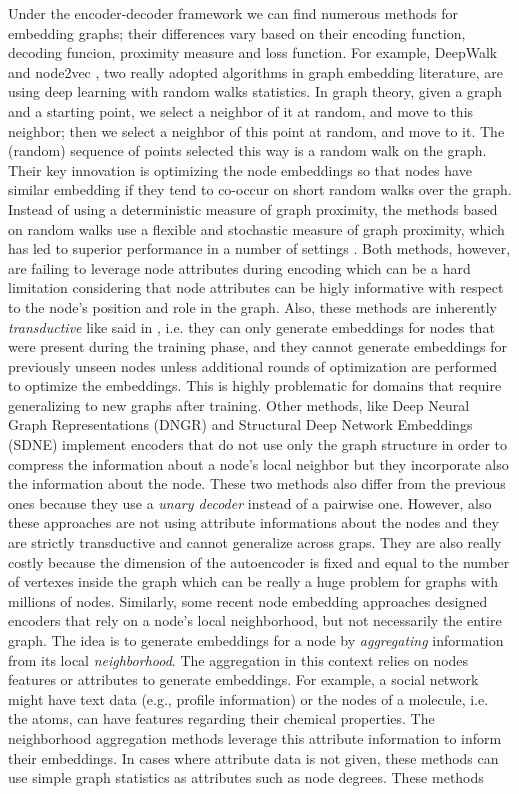 Under the encoder-decoder framework we can find numerous methods for embedding graphs; their differences vary based on their encoding function, decoding funcion, proximity measure and loss function. For example, DeepWalk \cite{deepWalk} and node2vec \cite{node2vec}, two really adopted algorithms in graph embedding literature, are using deep learning with random walks statistics. In graph theory, given a graph and a starting point, we select a neighbor of it at random, and move to this neighbor; then we select a neighbor of this point at random,
and move to it. The (random) sequence of points selected this way is a
random walk on the graph. Their key innovation is optimizing the node embeddings so that nodes have similar embedding if they tend to co-occur on short random walks over the graph. Instead of using a deterministic measure of graph proximity, the methods based on random walks use a flexible and stochastic measure of graph proximity, which has led to superior performance in a number of settings \cite{performanceRandomWalk}. Both methods, however, are failing to leverage node attributes during encoding which can be a hard limitation considering that node attributes can be higly informative with respect to the node's position and role in the graph. Also, these methods are inherently \textit{transductive} like said in \cite{transductive}, i.e. they can only generate embeddings for nodes that were present during the training phase, and they cannot generate embeddings for previously unseen nodes unless additional rounds of optimization are performed to optimize the embeddings. This is highly problematic for domains that require generalizing to new graphs after training.
Other methods, like Deep Neural Graph Representations (DNGR) \cite{DNGR} and Structural Deep Network Embeddings (SDNE) \cite{SDNE} implement encoders that do not use only the graph structure in order to compress the information about a node's local neighbor but they incorporate also the information about the node. These two methods also differ from the previous ones because they use a \textit{unary decoder} instead of a pairwise one. However, also these approaches are not using attribute informations about the nodes and they are strictly transductive and cannot generalize across graps. They are also really costly because the dimension of the autoencoder is fixed and equal to the number of vertexes inside the graph which can be really a huge problem for graphs with millions of nodes.
Similarly, some recent node embedding approaches designed encoders that rely on a node's local neighborhood, but not necessarily the entire graph. The idea is to generate embeddings for a node by \textit{aggregating} information from its local \textit{neighborhood}. The aggregation in this context relies on nodes features or attributes to generate embeddings. For example, a social network might have text data (e.g., profile information) or the nodes of a molecule, i.e. the atoms, can have features regarding their chemical properties. The neighborhood aggregation methods leverage this attribute information to inform their embeddings. In cases where attribute data is not given, these methods can use simple graph statistics as attributes such as node degrees. These methods
